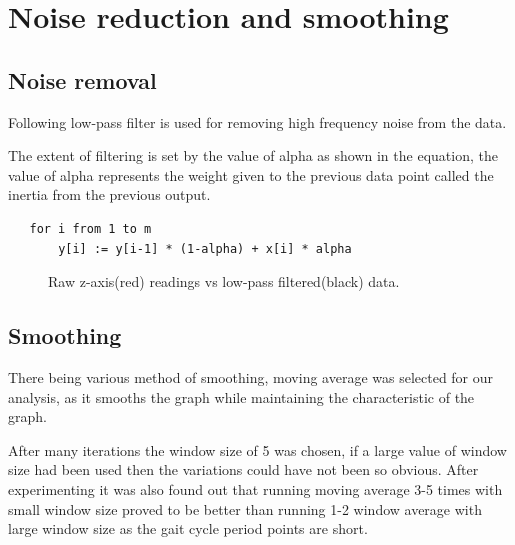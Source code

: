 \chapter{Noise reduction and smoothing}\label{final}
\section{Noise removal}

Following low-pass filter is used for removing high frequency noise from the data.

The extent of filtering is set by the value of alpha as shown in the equation, the value of alpha represents the weight given to the previous data point called the inertia from the previous output.

\begin{verbatim}
   for i from 1 to m
       y[i] := y[i-1] * (1-alpha) + x[i] * alpha 
\end{verbatim}\cite{lowpass}

\begin{figure}
\caption{Raw z-axis(red) readings vs low-pass filtered(black) data.}
\end{figure}


\section{Smoothing}
There being various method of smoothing, moving average was selected for our analysis, as it smooths the graph while maintaining the characteristic of the graph. \newline

After many iterations the window size of 5 was chosen, if a large value of window size had been used then the variations could have not been so obvious. After experimenting it was also found out that running moving average 3-5 times with small window size proved to be better than running 1-2 window average with large window size as the gait cycle period points are short. \newline


